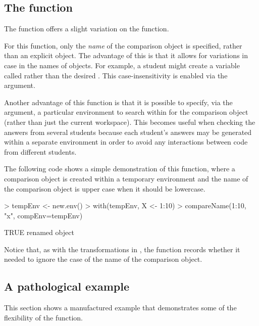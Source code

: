 \subsection*{The  function}

The  function offers a slight variation on the
 function.  

For this function, only the \emph{name} of
the comparison object is specified, rather than an explicit object.
The advantage of this is that it
 allows for variations in case in the names of objects.  For 
example, a student might create a variable called 
rather than the desired .  This 
case-insensitivity is enabled via
the  argument.

Another advantage of this function is that it is possible to specify,
via the  argument,
a particular environment to search within for the comparison object
(rather than just the current workspace).  This becomes useful
when checking the answers from several students because each student's
answers may be generated within a separate environment in order to avoid
any interactions between code from different students.

The following code shows a simple demonstration of this function,
where a comparison object is created within a temporary environment
and the name of the comparison object is upper case when it should 
be lowercase.

\begin{Schunk}
\begin{Sinput}
> tempEnv <- new.env()
> with(tempEnv, X <- 1:10)
> compareName(1:10, "x", compEnv=tempEnv)
\end{Sinput}
\begin{Soutput}
TRUE
  renamed object
\end{Soutput}
\end{Schunk}
Notice that, as with the transformations in ,
 the  
function records whether it needed to ignore the case
of the name of the comparison object.

\subsection*{A pathological example}

This section shows a manufactured example that demonstrates 
some of the flexibility of the  function.

